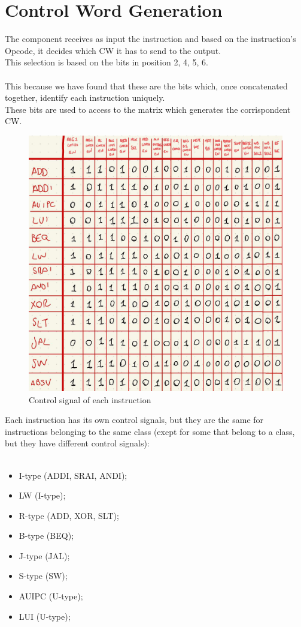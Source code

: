 \section{Control Word Generation}
The component receives as input the instruction and based on the instruction's Opcode, it decides which CW it has to send to the output. \\
This selection is based on the bits in position 2, 4, 5, 6. \\
\\
This because we have found that these are the bits which, once concatenated together, identify each instruction uniquely.\\
These bits are used to access to the matrix which generates the corrispondent CW.\\
\begin{figure}[h!]
	\centering
	\includegraphics[width=16cm]{./images/control_signals}
	\caption{Control signal of each instruction}
	\label{fig3.3}
\end{figure}
Each instruction has its own control signals, but they are the same for instructions belonging to the same class (exept for some that belong to a class, but they have different control signals):\\
\\
\begin{itemize}
	\item I-type (ADDI, SRAI, ANDI);
	\item LW (I-type);
	\item R-type (ADD, XOR, SLT);
	\item B-type (BEQ);
	\item J-type (JAL);
	\item S-type (SW);
	\item AUIPC (U-type);
	\item LUI (U-type);		
\end{itemize}
